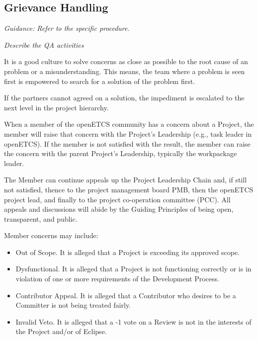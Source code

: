 \documentclass{template/openetcs_article}
\begin{document}
\subsection{Grievance Handling}
\textit{Guidance: Refer to the specific procedure. }

\textit{Describe the QA activities}


It is a good culture to solve concerns as close as possible to the root cause of an problem or a misunderstanding. This means, the team where a problem is seen first is empowered to search for a solution of the problem first.

If the partners cannot agreed on a solution, the impediment is escalated to the next level in the project hierarchy. 

When a member of the openETCS community has a concern about a Project, the  member will raise that concern with the Project's Leadership (e.g., task leader in openETCS). If the member is not satisfied with the result, the member can raise the concern with the parent Project's Leadership, typically the workpackage leader.

The Member can continue appeals up the Project Leadership Chain and, if still not satisfied, thence to the project management board PMB, then the openETCS project lead, and finally to the project co-operation committee (PCC). All appeals and discussions will abide by the Guiding Principles of being open, transparent, and public.

Member concerns may include:
\begin {itemize}
\item Out of Scope. It is alleged that a Project is exceeding its approved scope.

\item Dysfunctional. It is alleged that a Project is not functioning correctly or is in violation of one or more requirements of the Development Process.\

\item Contributor Appeal. It is alleged that a Contributor who desires to be a Committer is not being treated fairly.

\item Invalid Veto. It is alleged that a -1 vote on a Review is not in the interests of the Project and/or of Eclipse.
\end{itemize}
\end{document}
